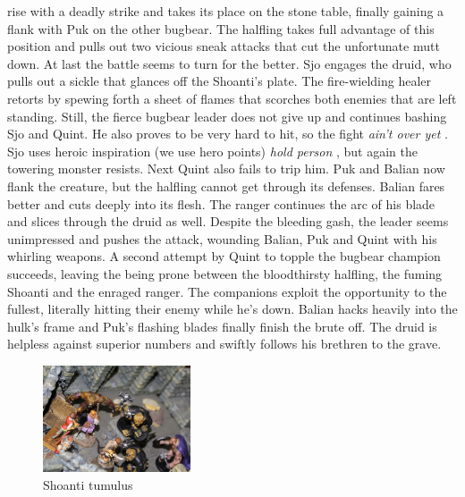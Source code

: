 rise with a deadly strike and takes its place on the stone table, finally gaining a flank with Puk on the other bugbear. The halfling takes full advantage of this position and pulls out two vicious sneak attacks that cut the unfortunate mutt down. At last the battle seems to turn for the better. Sjo engages the druid, who pulls out a sickle that glances off the Shoanti's plate. The fire-wielding healer retorts by spewing forth a sheet of flames that scorches both enemies that are left standing. Still, the fierce bugbear leader does not give up and continues bashing Sjo and Quint. He also proves to be very hard to hit, so the fight  {\itshape ain't over yet} . Sjo uses heroic inspiration (we use hero points)  {\itshape hold person} , but again the towering monster resists. Next Quint also fails to trip him. Puk and Balian now flank the creature, but the halfling cannot get through its defenses. Balian fares better and cuts deeply into its flesh. The ranger continues the arc of his blade and slices through the druid as well. Despite the bleeding gash, the leader seems unimpressed and pushes the attack, wounding Balian, Puk and Quint with his whirling weapons. A second attempt by Quint to topple the bugbear champion succeeds, leaving the being prone between the bloodthirsty halfling, the fuming Shoanti and the enraged ranger. The companions exploit the opportunity to the fullest, literally hitting their enemy while he's down. Balian hacks heavily into the hulk's frame and Puk's flashing blades finally finish the brute off. The druid is helpless against superior numbers and swiftly follows his brethren to the grave. \\

\begin{figure}[h]
	\centering
	\includegraphics[width=0.39\textwidth]{images/Shoanti-tumulus-475539806.jpg}
	\caption{Shoanti tumulus}
	\label{fig:Shoanti-tumulus-475539806}
\end{figure}

